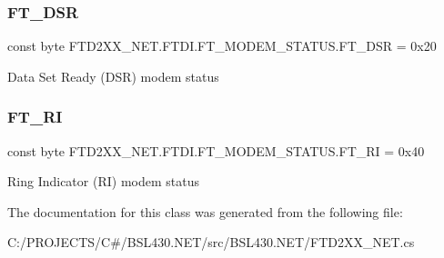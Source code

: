\subsubsection{\texorpdfstring{FT\_DSR}{FT\_DSR}}
{\footnotesize\ttfamily const byte F\+T\+D2\+X\+X\+\_\+\+N\+E\+T.\+F\+T\+D\+I.\+F\+T\+\_\+\+M\+O\+D\+E\+M\+\_\+\+S\+T\+A\+T\+U\+S.\+F\+T\+\_\+\+D\+SR = 0x20}



Data Set Ready (D\+SR) modem status 

\mbox{\label{class_f_t_d2_x_x___n_e_t_1_1_f_t_d_i_1_1_f_t___m_o_d_e_m___s_t_a_t_u_s_af018ccc5ca1d110530a865757a14a784}} 
\subsubsection{\texorpdfstring{FT\_RI}{FT\_RI}}
{\footnotesize\ttfamily const byte F\+T\+D2\+X\+X\+\_\+\+N\+E\+T.\+F\+T\+D\+I.\+F\+T\+\_\+\+M\+O\+D\+E\+M\+\_\+\+S\+T\+A\+T\+U\+S.\+F\+T\+\_\+\+RI = 0x40}



Ring Indicator (RI) modem status 



The documentation for this class was generated from the following file\+:\begin{DoxyCompactItemize}
\item 
C\+:/\+P\+R\+O\+J\+E\+C\+T\+S/\+C\#/\+B\+S\+L430.\+N\+E\+T/src/\+B\+S\+L430.\+N\+E\+T/F\+T\+D2\+X\+X\+\_\+\+N\+E\+T.\+cs\end{DoxyCompactItemize}
